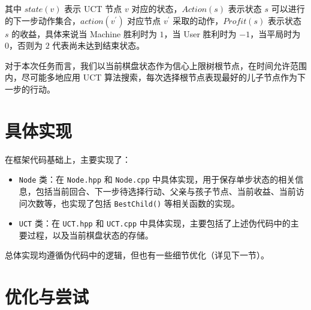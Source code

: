 \documentclass[a4paper]{article}
\begin{document}
    其中 $state(v)$ 表示 UCT 节点 $v$ 对应的状态，$Action(s)$ 表示状态 $s$ 可以进行的下一步动作集合，$action(v^\prime)$ 对应节点 $v^\prime$ 采取的动作，$Profit(s)$ 表示状态 $s$ 的收益，具体来说当 Machine 胜利时为 $1$，当 User 胜利时为 $-1$，当平局时为 $0$，否则为 $2$ 代表尚未达到结束状态。

    对于本次任务而言，我们以当前棋盘状态作为信心上限树根节点，在时间允许范围内，尽可能多地应用 UCT 算法搜索，每次选择根节点表现最好的儿子节点作为下一步的行动。

    \section{具体实现}

    在框架代码基础上，主要实现了：
    \begin{itemize}
        \item \texttt{Node} 类：在 \texttt{Node.hpp} 和 \texttt{Node.cpp} 中具体实现，用于保存单步状态的相关信息，包括当前回合、下一步待选择行动、父亲与孩子节点、当前收益、当前访问次数等，也实现了包括 \texttt{BestChild()} 等相关函数的实现。
        \item \texttt{UCT} 类：在 \texttt{UCT.hpp} 和 \texttt{UCT.cpp} 中具体实现，主要包括了上述伪代码中的主要过程，以及当前棋盘状态的存储。
    \end{itemize}

    总体实现均遵循伪代码中的逻辑，但也有一些细节优化（详见下一节）。

    \section{优化与尝试}
\end{document}
